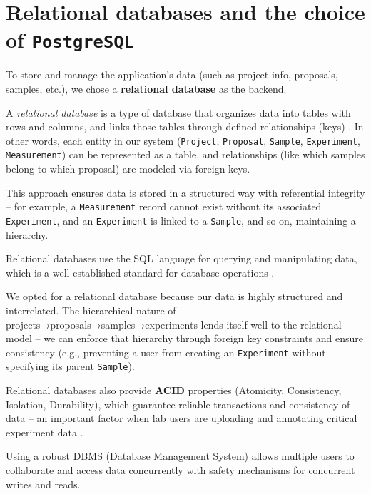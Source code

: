\section{Relational databases and the choice of \texttt{PostgreSQL}}

To store and manage the application’s data (such as project info, proposals, 
samples, etc.), we chose a \textbf{relational database} as the backend. 

A \emph{relational database} is a type of database that organizes data into 
tables with rows and columns, and links those tables through defined 
relationships (keys) \parencite{ElmasriNavathe}. In other words, each entity in 
our system (\texttt{Project}, \texttt{Proposal}, \texttt{Sample}, 
\texttt{Experiment}, \texttt{Measurement}) can be represented as a table, and 
relationships (like which samples belong to which proposal) are modeled via 
foreign keys. 

This approach ensures data is stored in a structured way with referential 
integrity – for example, a \texttt{Measurement} record cannot exist without its 
associated \texttt{Experiment}, and an \texttt{Experiment} is linked to a 
\texttt{Sample}, and so on, maintaining a hierarchy. 

\medskip

Relational databases use the SQL language for querying and manipulating data, 
which is a well-established standard for database 
operations \parencite{ElmasriNavathe}. 

We opted for a relational database because our data is highly structured and 
interrelated. The hierarchical nature of projects→proposals→samples→experiments 
lends itself well to the relational model – we can enforce that hierarchy 
through foreign key constraints and ensure consistency (e.g., preventing a user 
from creating an \texttt{Experiment} without specifying its parent 
\texttt{Sample}). 

\medskip

Relational databases also provide \textbf{ACID} properties (Atomicity, 
Consistency, Isolation, Durability), which guarantee reliable transactions and 
consistency of data – an important factor when lab users are uploading and 
annotating critical experiment data \parencite{PostgresAbout}. 

Using a robust DBMS (Database Management System) allows multiple users to 
collaborate and access data concurrently with safety mechanisms for concurrent 
writes and reads. 

\medskip

